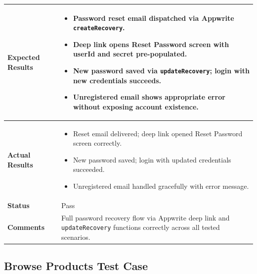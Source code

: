 \begin{table}[H]
\begin{tabular}{|p{3.2cm}|p{10.8cm}|}
\textbf{Expected Results} &
\begin{itemize}[leftmargin=*,noitemsep]
\item Password reset email dispatched via Appwrite \texttt{createRecovery}.
\item Deep link opens Reset Password screen with userId and secret pre-populated.
\item New password saved via \texttt{updateRecovery}; login with new credentials succeeds.
\item Unregistered email shows appropriate error without exposing account existence.
\end{itemize} \\ \hline
\textbf{Actual Results} &
\begin{itemize}[leftmargin=*,noitemsep]
\item Reset email delivered; deep link opened Reset Password screen correctly.
\item New password saved; login with updated credentials succeeded.
\item Unregistered email handled gracefully with error message.
\end{itemize} \\ \hline
\textbf{Status} & Pass \\ \hline
\textbf{Comments} & Full password recovery flow via Appwrite deep link and \texttt{updateRecovery} functions correctly across all tested scenarios. \\ \hline
\end{tabular}
\end{table}

\newpage
\subsection{Browse Products Test Case}

